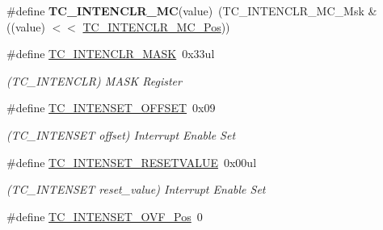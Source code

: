 \begin{DoxyCompactItemize}
\item 
\hypertarget{group___s_a_m_l21___t_c_ga775d5e985e44041de70102de750a53ff}{}\#define {\bfseries T\+C\+\_\+\+I\+N\+T\+E\+N\+C\+L\+R\+\_\+\+M\+C}(value)~(T\+C\+\_\+\+I\+N\+T\+E\+N\+C\+L\+R\+\_\+\+M\+C\+\_\+\+Msk \& ((value) $<$$<$ \hyperlink{group___s_a_m_l21___t_c_ga3826df25c9857e2d7c15e1eb646fab6d}{T\+C\+\_\+\+I\+N\+T\+E\+N\+C\+L\+R\+\_\+\+M\+C\+\_\+\+Pos}))\label{group___s_a_m_l21___t_c_ga775d5e985e44041de70102de750a53ff}

\item 
\hypertarget{group___s_a_m_l21___t_c_ga5a020033ada1e4c780d4c58366687acb}{}\#define \hyperlink{group___s_a_m_l21___t_c_ga5a020033ada1e4c780d4c58366687acb}{T\+C\+\_\+\+I\+N\+T\+E\+N\+C\+L\+R\+\_\+\+M\+A\+S\+K}~0x33ul\label{group___s_a_m_l21___t_c_ga5a020033ada1e4c780d4c58366687acb}

\begin{DoxyCompactList}\small\item\em (T\+C\+\_\+\+I\+N\+T\+E\+N\+C\+L\+R) M\+A\+S\+K Register \end{DoxyCompactList}\item 
\hypertarget{group___s_a_m_l21___t_c_gaa152673d834fb0e9adb1484a59231947}{}\#define \hyperlink{group___s_a_m_l21___t_c_gaa152673d834fb0e9adb1484a59231947}{T\+C\+\_\+\+I\+N\+T\+E\+N\+S\+E\+T\+\_\+\+O\+F\+F\+S\+E\+T}~0x09\label{group___s_a_m_l21___t_c_gaa152673d834fb0e9adb1484a59231947}

\begin{DoxyCompactList}\small\item\em (T\+C\+\_\+\+I\+N\+T\+E\+N\+S\+E\+T offset) Interrupt Enable Set \end{DoxyCompactList}\item 
\hypertarget{group___s_a_m_l21___t_c_gada1fd36f73b5409aaade918db17549aa}{}\#define \hyperlink{group___s_a_m_l21___t_c_gada1fd36f73b5409aaade918db17549aa}{T\+C\+\_\+\+I\+N\+T\+E\+N\+S\+E\+T\+\_\+\+R\+E\+S\+E\+T\+V\+A\+L\+U\+E}~0x00ul\label{group___s_a_m_l21___t_c_gada1fd36f73b5409aaade918db17549aa}

\begin{DoxyCompactList}\small\item\em (T\+C\+\_\+\+I\+N\+T\+E\+N\+S\+E\+T reset\+\_\+value) Interrupt Enable Set \end{DoxyCompactList}\item 
\hypertarget{group___s_a_m_l21___t_c_gab2ff8ba9f2b0d7ecc5c5451da3429492}{}\#define \hyperlink{group___s_a_m_l21___t_c_gab2ff8ba9f2b0d7ecc5c5451da3429492}{T\+C\+\_\+\+I\+N\+T\+E\+N\+S\+E\+T\+\_\+\+O\+V\+F\+\_\+\+Pos}~0\label{group___s_a_m_l21___t_c_gab2ff8ba9f2b0d7ecc5c5451da3429492}


\end{DoxyCompactItemize}
